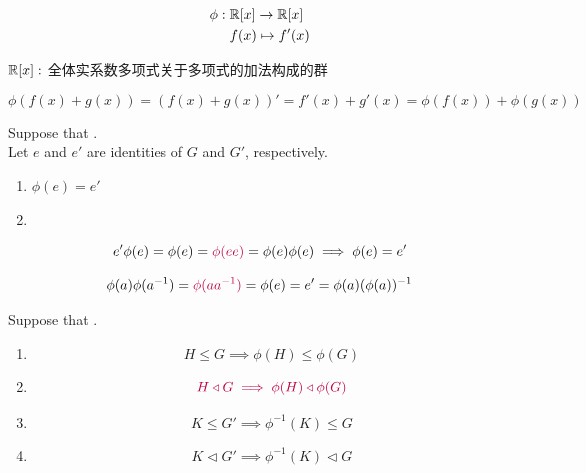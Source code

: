 \begin{frame}{}
  \begin{align*}
    \phi:\; & \mathbb{R}[x] \to \mathbb{R}[x] \\
            & f(x) \mapsto f'(x)
  \end{align*}

  \vspace{0.30cm}
  \begin{center}
    $\mathbb{R}[x]:$ 全体实系数多项式关于多项式的加法构成的群
  \end{center}

  \[
    \phi(f(x) + g(x)) = (f(x) + g(x))'
      = f'(x) + g'(x) = \phi(f(x)) + \phi(g(x))
  \]
\end{frame}

\begin{frame}{}
  \begin{theorem}
    Suppose that . \\
    Let $e$ and $e'$ are identities of $G$ and $G'$, respectively.

    \begin{enumerate}[(1)]
      \setlength{\itemsep}{6pt}
      \item $\phi(e) = e'$
      \item {}
    \end{enumerate}
  \end{theorem}

  \pause
  \[
    e' \phi(e) = \phi(e) = \textcolor{purple}{\phi(e e)} = \phi(e) \phi(e) \implies \phi(e) = e'
  \]

  \pause
  \[
    \phi(a)\phi(a^{-1}) = \textcolor{purple}{\phi(aa^{-1})} = \phi(e) = e' = \phi(a)(\phi(a))^{-1}
  \]
\end{frame}

\begin{frame}
  \begin{theorem}
    Suppose that . \\
    \begin{enumerate}[(1)]
      \item
        \[
          H \le G \implies \phi(H) \le \phi(G)
        \]
      \item
        \[
          \textcolor{purple}{H \triangleleft G \implies \phi(H) \triangleleft \phi(G)}
        \]
      \pause
      \item
        \[
          K \le G' \implies \phi^{-1}(K) \le G
        \]
      \item
        \[
          K \triangleleft G' \implies \phi^{-1}(K) \triangleleft G
        \]
    \end{enumerate}
  \end{theorem}
\end{frame}

